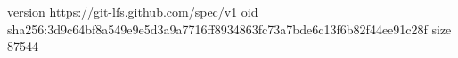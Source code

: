 version https://git-lfs.github.com/spec/v1
oid sha256:3d9c64bf8a549e9e5d3a9a7716ff8934863fc73a7bde6c13f6b82f44ee91c28f
size 87544
